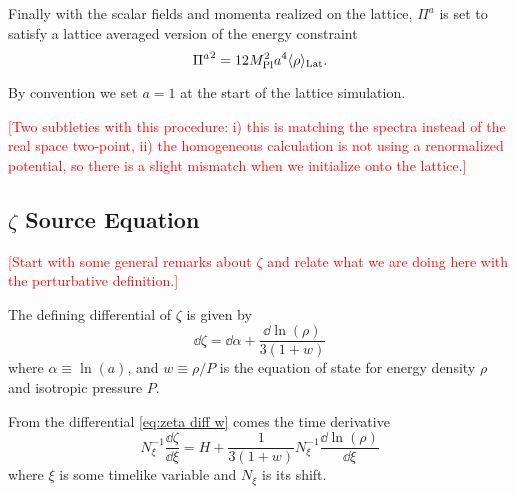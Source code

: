 Finally with the scalar fields and momenta realized on the lattice, $\Pi^a$ is set to satisfy a lattice averaged version of the energy constraint
\begin{equation} \label{eq:energy constraint}
  {\Pi^a}^2 = 12M_{\mathrm{Pl}}^2a^4\langle \rho \rangle_{\mathrm{Lat}}.
\end{equation}

By convention we set $a=1$ at the start of the lattice simulation.

\textcolor{red}{[Two subtleties with this procedure: i) this is matching the spectra instead of the real space two-point, ii) the homogeneous calculation is not using a renormalized potential, so there is a slight mismatch when we initialize onto the lattice.]}

\subsection{$\zeta$ Source Equation} \label{sec:zeta source}
\textcolor{red}{[Start with some general remarks about $\zeta$ and relate what we are doing here with the perturbative definition.]}



The defining differential of $\zeta$ is given by
\begin{equation}
  \dd\zeta = \dd\alpha + \frac{\dd\ln(\rho)}{3(1+w)} \label{eq:zeta diff w}
\end{equation}
where $\alpha \equiv \ln(a)$, and $w \equiv \rho/P$ is the equation of state for energy density $\rho$ and isotropic pressure $P$. 

From the differential \eqref{eq:zeta diff w} comes the time derivative
\begin{equation}
  N_\xi^{-1}\frac{\dd\zeta}{\dd\xi} = H + \frac{1}{3(1 + w)}N_\xi^{-1}\frac{\dd\ln(\rho)}{\dd\xi} \label{eq:zeta der xi}
\end{equation}
where $\xi$ is some timelike variable and $N_\xi$ is its shift.

